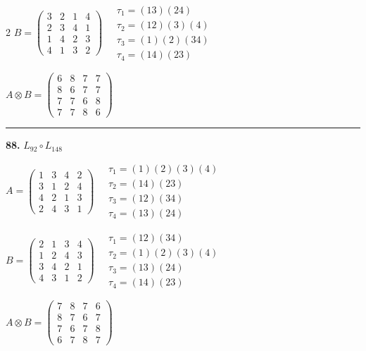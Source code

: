 \begin{multicols}{2}
$B = \begin{pmatrix} 3 & 2 & 1 & 4 \\ 2 & 3 & 4 & 1 \\ 1 & 4 & 2 & 3 \\ 4 & 1 & 3 & 2 \end{pmatrix} \quad \begin{matrix} \tau_{1}=(1 3)(2 4) \\ \tau_{2}=(1 2)(3)(4) \\ \tau_{3}=(1)(2)(3 4) \\ \tau_{4}=(1 4)(2 3) \end{matrix}$

$A \otimes B = \begin{pmatrix} 6 & 8 & 7 & 7 \\ 8 & 6 & 7 & 7 \\ 7 & 7 & 6 & 8 \\ 7 & 7 & 8 & 6 \end{pmatrix}$

\vspace{0.3em}
\hrule
\vspace{0.3em}

\noindent\textbf{88.} $L_{92} \circ L_{148}$

$A = \begin{pmatrix} 1 & 3 & 4 & 2 \\ 3 & 1 & 2 & 4 \\ 4 & 2 & 1 & 3 \\ 2 & 4 & 3 & 1 \end{pmatrix} \quad \begin{matrix} \tau_{1}=(1)(2)(3)(4) \\ \tau_{2}=(1 4)(2 3) \\ \tau_{3}=(1 2)(3 4) \\ \tau_{4}=(1 3)(2 4) \end{matrix}$

$B = \begin{pmatrix} 2 & 1 & 3 & 4 \\ 1 & 2 & 4 & 3 \\ 3 & 4 & 2 & 1 \\ 4 & 3 & 1 & 2 \end{pmatrix} \quad \begin{matrix} \tau_{1}=(1 2)(3 4) \\ \tau_{2}=(1)(2)(3)(4) \\ \tau_{3}=(1 3)(2 4) \\ \tau_{4}=(1 4)(2 3) \end{matrix}$

$A \otimes B = \begin{pmatrix} 7 & 8 & 7 & 6 \\ 8 & 7 & 6 & 7 \\ 7 & 6 & 7 & 8 \\ 6 & 7 & 8 & 7 \end{pmatrix}$


\end{multicols}
